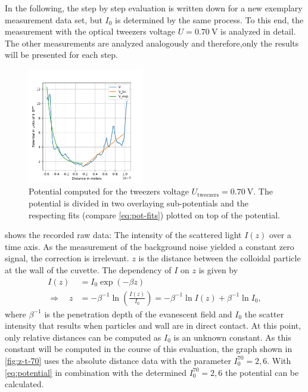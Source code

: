 \documentclass[../bericht.tex]{subfiles}
\begin{document}
      In the following, the step by step evaluation is written down for a new exemplary measurement data set, but $I_0$ is determined by the same process. To this end, the measurement with the optical tweezers voltage $U=\SI{0,70}{\volt}$ is analyzed in detail.  The other measurements are analyzed analogously and therefore,only the results will be presented for each step.
      \medskip

      \begin{figure}[tb]
        \centering
        \includegraphics[width=0.45\textwidth]{figures/70_potential.pdf}
        \caption[Potential computed for the tweezers voltage $U_\mathrm{tweezers}=\SI{0,70}{\volt}$.]{Potential computed for the tweezers voltage $U_\mathrm{tweezers}=\SI{0,70}{\volt}$. The potential is divided in two overlaying sub-potentials and the respecting fits (compare \cref{eq:pot-fits}) plotted on top of the potential.}
        \label{fig:potential-with-fits-70}
      \end{figure}

       shows the recorded raw data: The intensity of the scattered light $I(z)$ over a time axis. As the measurement of the background noise yielded a constant zero signal, the correction is irrelevant.  $z$ is the distance between the colloidal particle at the wall of the cuvette. The dependency of $I$ on $z$ is given by
      \begin{align}
        I(z)&=I_0 \exp\left( -\beta z \right)  \\
        \Rightarrow \quad z&=-\beta^{-1} \ln \left(\frac{I(z)}{I_0}\right)=-\beta^{-1}\ln I(z) + \beta^{-1}\ln I_0,
      \end{align}
      where $\beta^{-1}$ is the penetration depth of the evanescent field and $I_0$ the scatter intensity that results when particles and wall are in direct contact. At this point, only relative distances can be computed as $I_0$ is an unknown constant. As this constant will be computed in the course of this evaluation, the graph shown in \cref{fig:z-t-70} uses the absolute distance data with the parameter $I_0^{70}=2,6$. With \cref{eq:potential} in combination with the determined  $I_0^{70}=2,6$ the potential can be calculated.
\end{document}
